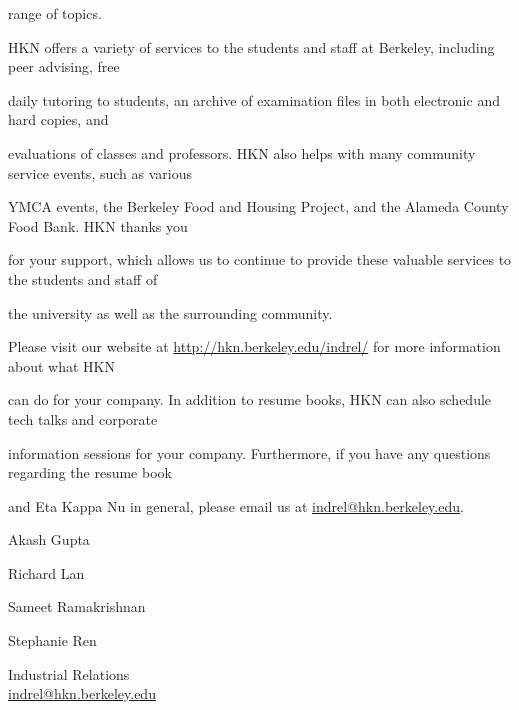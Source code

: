 \documentclass[11pt]{article}
\begin{document}
range of topics.



HKN offers a variety of services to the students and staff at Berkeley, including peer advising, free

daily tutoring to students, an archive of examination files in both electronic and hard copies, and

evaluations of classes and professors. HKN also helps with many community service events, such as various

YMCA events, the Berkeley Food and Housing Project, and the Alameda County Food Bank. HKN thanks you

for your support, which allows us to continue to provide these valuable services to the students and staff of

the university as well as the surrounding community. 



Please visit our website at \url{http://hkn.berkeley.edu/indrel/} for more information about what HKN

can do for your company. In addition to resume books, HKN can also schedule tech talks and corporate

information sessions for your company. Furthermore, if you have any questions regarding the resume book

and Eta Kappa Nu in general, please email us at \url{indrel@hkn.berkeley.edu}. 

	\begin{list}{}{\setlength{\itemsep}{-2mm} \setlength{\leftmargin}{0pt}}

    

		\item Akash Gupta

    

		\item Richard Lan

    

		\item Sameet Ramakrishnan

    

		\item Stephanie Ren

    

	\end{list}

Industrial Relations \\

\url{indrel@hkn.berkeley.edu}
\end{document}
